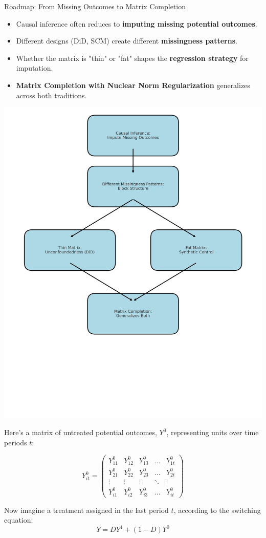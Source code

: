 \documentclass{beamer}
\begin{document}
\begin{frame}{Roadmap: From Missing Outcomes to Matrix Completion}

\begin{itemize}
  \item Causal inference often reduces to \textbf{imputing missing potential outcomes}.
  \item Different designs (DiD, SCM) create different \textbf{missingness patterns}.
  \item Whether the matrix is "thin" or "fat" shapes the \textbf{regression strategy} for imputation.
  \item \textbf{Matrix Completion with Nuclear Norm Regularization} generalizes across both traditions.
\end{itemize}

\begin{center}
\includegraphics[width=0.5\linewidth]{./lecture_includes/flowchart.png}
\end{center}
\end{frame}



\begin{frame}[plain]
\small
Here's a matrix of untreated potential outcomes, $Y^0$, representing units over time periods $t$:
\begin{center}
\[
Y^0_{it} = \begin{pmatrix}
Y^0_{11} & Y^0_{12} & Y^0_{13} & \dots & Y^0_{1t} \\
Y^0_{21} & Y^0_{22} & Y^0_{23} & \dots & Y^0_{2t} \\
\vdots & \vdots & \vdots & \ddots & \vdots \\
Y^0_{i1} & Y^0_{i2} & Y^0_{i3} & \dots & Y^0_{it}
\end{pmatrix}
\]
\end{center}

Now imagine a treatment assigned in the last period $t$, according to the switching equation:
\[
Y = DY^1 + (1-D)Y^0
\]
\end{frame}
\end{document}
